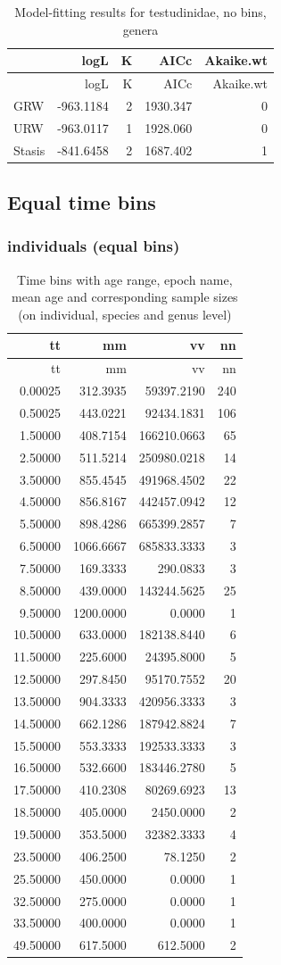 \documentclass[]{article}
\begin{document}
\begin{longtable}[]{@{}lrrrr@{}}
\caption{Model-fitting results for testudinidae, no bins,
genera}\tabularnewline
\toprule
& logL & K & AICc & Akaike.wt\tabularnewline
\midrule
\endfirsthead
\toprule
& logL & K & AICc & Akaike.wt\tabularnewline
\midrule
\endhead
GRW & -963.1184 & 2 & 1930.347 & 0\tabularnewline
URW & -963.0117 & 1 & 1928.060 & 0\tabularnewline
Stasis & -841.6458 & 2 & 1687.402 & 1\tabularnewline
\bottomrule
\end{longtable}

\newpage

\subsection{Equal time bins}\label{equal-time-bins}

\subsubsection{individuals (equal bins)}\label{individuals-equal-bins}

\begin{longtable}[]{@{}rrrr@{}}
\caption{Time bins with age range, epoch name, mean age and
corresponding sample sizes (on individual, species and genus
level)}\tabularnewline
\toprule
tt & mm & vv & nn\tabularnewline
\midrule
\endfirsthead
\toprule
tt & mm & vv & nn\tabularnewline
\midrule
\endhead
0.00025 & 312.3935 & 59397.2190 & 240\tabularnewline
0.50025 & 443.0221 & 92434.1831 & 106\tabularnewline
1.50000 & 408.7154 & 166210.0663 & 65\tabularnewline
2.50000 & 511.5214 & 250980.0218 & 14\tabularnewline
3.50000 & 855.4545 & 491968.4502 & 22\tabularnewline
4.50000 & 856.8167 & 442457.0942 & 12\tabularnewline
5.50000 & 898.4286 & 665399.2857 & 7\tabularnewline
6.50000 & 1066.6667 & 685833.3333 & 3\tabularnewline
7.50000 & 169.3333 & 290.0833 & 3\tabularnewline
8.50000 & 439.0000 & 143244.5625 & 25\tabularnewline
9.50000 & 1200.0000 & 0.0000 & 1\tabularnewline
10.50000 & 633.0000 & 182138.8440 & 6\tabularnewline
11.50000 & 225.6000 & 24395.8000 & 5\tabularnewline
12.50000 & 297.8450 & 95170.7552 & 20\tabularnewline
13.50000 & 904.3333 & 420956.3333 & 3\tabularnewline
14.50000 & 662.1286 & 187942.8824 & 7\tabularnewline
15.50000 & 553.3333 & 192533.3333 & 3\tabularnewline
16.50000 & 532.6600 & 183446.2780 & 5\tabularnewline
17.50000 & 410.2308 & 80269.6923 & 13\tabularnewline
18.50000 & 405.0000 & 2450.0000 & 2\tabularnewline
19.50000 & 353.5000 & 32382.3333 & 4\tabularnewline
23.50000 & 406.2500 & 78.1250 & 2\tabularnewline
25.50000 & 450.0000 & 0.0000 & 1\tabularnewline
32.50000 & 275.0000 & 0.0000 & 1\tabularnewline
33.50000 & 400.0000 & 0.0000 & 1\tabularnewline
49.50000 & 617.5000 & 612.5000 & 2\tabularnewline
\bottomrule
\end{longtable}
\end{document}
